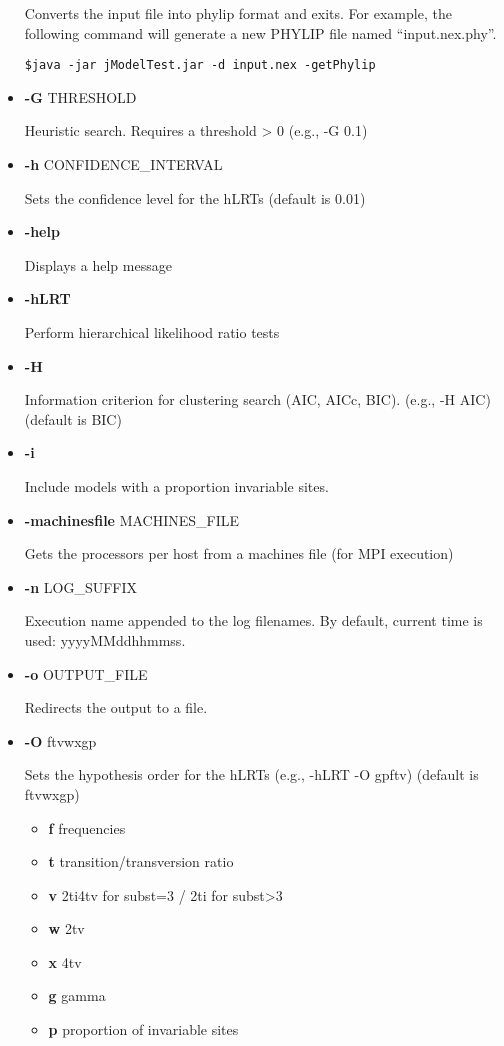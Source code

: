 \documentclass[11pt,twoside,a4paper]{article}
\begin{document}
\begin{itemize}
Converts the input file into phylip format and exits. For example, the following command will generate a new PHYLIP file named ``input.nex.phy''.
\begin{lstlisting}
$java -jar jModelTest.jar -d input.nex -getPhylip
\end{lstlisting}

\item  {\bf -G} THRESHOLD

Heuristic search. Requires a threshold > 0 (e.g., -G 0.1)

\item  {\bf -h} CONFIDENCE\_INTERVAL

Sets the confidence level for the hLRTs (default is 0.01)

\item  {\bf -help}

Displays a help message

\item  {\bf -hLRT}

Perform hierarchical likelihood ratio tests

\item  {\bf -H}

Information criterion for clustering search (AIC, AICc, BIC). (e.g., -H AIC) (default is BIC)

\item  {\bf -i}

Include models with a proportion invariable sites.

\item  {\bf -machinesfile} MACHINES\_FILE

Gets the processors per host from a machines file (for MPI execution)

\item  {\bf -n} LOG\_SUFFIX

Execution name appended to the log filenames. By default, current time is used: yyyyMMddhhmmss.

\item  {\bf -o} OUTPUT\_FILE

Redirects the output to a file.

\item  {\bf -O} {ftvwxgp}

Sets the hypothesis order for the hLRTs (e.g., -hLRT -O gpftv) (default is ftvwxgp)
\begin{itemize}
\item {\bf f} frequencies
\item {\bf t} transition/transversion ratio
\item {\bf v} 2ti4tv for subst=3 / 2ti for subst>3
\item {\bf w} 2tv
\item {\bf x} 4tv
\item {\bf g} gamma
\item {\bf p} proportion of invariable sites
\end{itemize}


\end{itemize}
\end{document}
